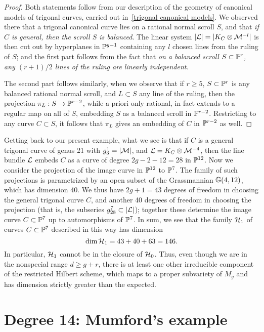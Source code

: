 \begin{proof}
Both statements follow from our description of the geometry of canonical models of trigonal curves, carried out in~\ref{trigonal canonical models}. We observed there that a trigonal canonical curve lies on a rational normal scroll $S$, and that \emph{if $C$ is general, then the scroll $S$ is balanced}. The linear system $|\cL| = | K_C \otimes \cM^{-l}|$ is then cut out by hyperplanes in $\PP^{g-1}$ containing  any $l$ chosen lines from the ruling of $S$; and the first part follows from the fact that \emph{on a balanced scroll $S \subset \PP^r$, any $(r+1)/2$ lines of the ruling are linearly independent.}

The second part follows similarly, when we observe that if $r \geq 5$, $S \subset \PP^r$ is any balanced rational normal scroll, and $L \subset S$ any line of the ruling, then the projection $\pi_L : S \to \PP^{r-2}$, while a priori only rational, in fact extends to a regular map on all of $S$, embedding $S$ as a balanced scroll in $\PP^{r-2}$. Restricting to any curve $C \subset S$, it follows that $\pi_L$ gives an embedding of $C$ in $\PP^{r-2}$ as well.
\end{proof}

Getting back to our present example, what we see is that if $C$ is a general trigonal curve of genus 21 with $g^1_3 = |\cM|$, and $\cL = K_C \otimes \cM^{-4}$, then the line bundle $\cL$ embeds $C$ as a curve of degree $2g-2-12 = 28$ in $\PP^{12}$. Now we consider the projection of the image curve in $\PP^{12}$ to $\PP^7$. The  family of such projections is parametrized by an open subset of the Grassmannian $\GG(4, 12)$, which has dimension 40. We thus have $2g+1 = 43$ degrees of freedom in choosing the general trigonal curve $C$, and another 40 degrees of freedom in choosing the projection (that is, the subseries $g^7_{28} \subset |\cL|$); together these determine the image curve $C \subset \PP^7$ up to automorphisms of $\PP^7$. In sum, we see that the family $\cH_1$ of curves $C \subset \PP^7$ described in this way has dimension
$$
\dim \cH_1 = 43 + 40 + 63 = 146.
$$
In particular, $\cH_1$ cannot be in the closure of $\cH_0$. Thus, even though we are in the nonspecial range $d \geq g+r$, there is at least one other irreducible component of the restricted Hilbert scheme, which maps to a proper subvariety of $M_g$ and has dimension strictly greater than the expected.


\section{Degree 14: Mumford's example}\label{mumford example}

